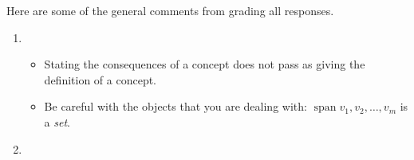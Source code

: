 \documentclass{amsart}
\theoremstyle{definition}
\theoremstyle{definition}
\DeclareMathOperator{\1}{\mathbbm{1}}
\DeclareMathOperator{\Span}{span}
\begin{document}
\noindent Here are some of the general comments from grading all responses.

\bigskip

\begin{enumerate}[itemsep = 1.5mm]
	\item \begin{itemize}
		\item Stating the consequences of a concept does not pass as giving the definition of a concept.
		\item Be careful with the objects that you are dealing with: $\Span{v_1,v_2,\dots,v_m}$ is a \textit{set}. 
	\end{itemize}
	
	\item 
\end{enumerate}
\end{document}
